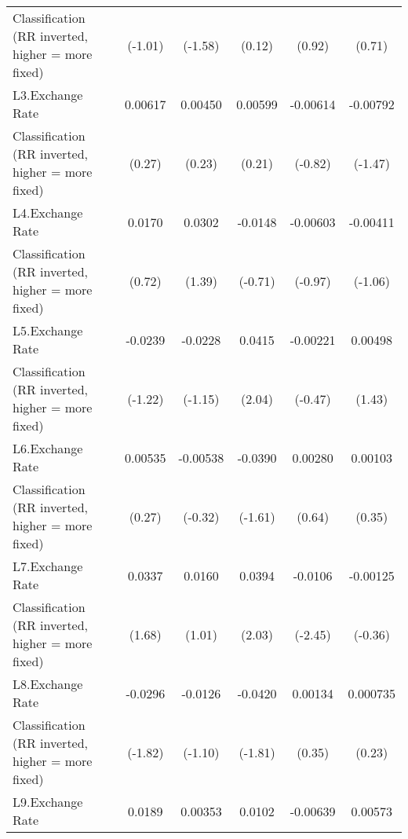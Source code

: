 {\begin{tabular}{l*{5}{c}}
Classification (RR inverted, higher = more fixed)&     (-1.01)         &     (-1.58)         &      (0.12)         &      (0.92)         &      (0.71)         \\
[1em]
L3.Exchange Rate    &     0.00617         &     0.00450         &     0.00599         &    -0.00614         &    -0.00792         \\
Classification (RR inverted, higher = more fixed)&      (0.27)         &      (0.23)         &      (0.21)         &     (-0.82)         &     (-1.47)         \\
[1em]
L4.Exchange Rate    &      0.0170         &      0.0302         &     -0.0148         &    -0.00603         &    -0.00411         \\
Classification (RR inverted, higher = more fixed)&      (0.72)         &      (1.39)         &     (-0.71)         &     (-0.97)         &     (-1.06)         \\
[1em]
L5.Exchange Rate    &     -0.0239         &     -0.0228         &      0.0415\sym{*}  &    -0.00221         &     0.00498         \\
Classification (RR inverted, higher = more fixed)&     (-1.22)         &     (-1.15)         &      (2.04)         &     (-0.47)         &      (1.43)         \\
[1em]
L6.Exchange Rate    &     0.00535         &    -0.00538         &     -0.0390         &     0.00280         &     0.00103         \\
Classification (RR inverted, higher = more fixed)&      (0.27)         &     (-0.32)         &     (-1.61)         &      (0.64)         &      (0.35)         \\
[1em]
L7.Exchange Rate    &      0.0337         &      0.0160         &      0.0394\sym{*}  &     -0.0106\sym{*}  &    -0.00125         \\
Classification (RR inverted, higher = more fixed)&      (1.68)         &      (1.01)         &      (2.03)         &     (-2.45)         &     (-0.36)         \\
[1em]
L8.Exchange Rate    &     -0.0296         &     -0.0126         &     -0.0420         &     0.00134         &    0.000735         \\
Classification (RR inverted, higher = more fixed)&     (-1.82)         &     (-1.10)         &     (-1.81)         &      (0.35)         &      (0.23)         \\
[1em]
L9.Exchange Rate    &      0.0189         &     0.00353         &      0.0102         &    -0.00639         &     0.00573         \\

\end{tabular}}
